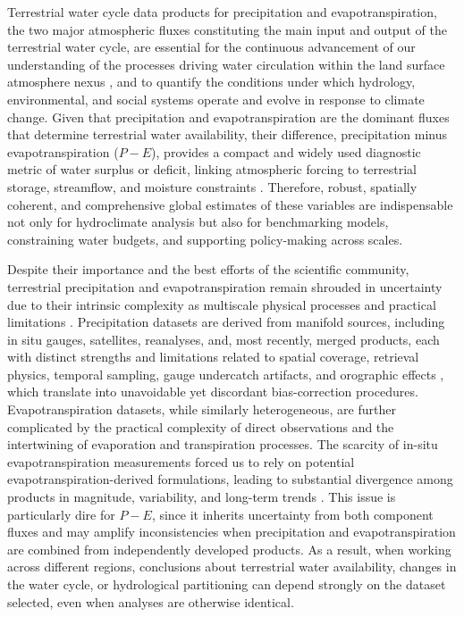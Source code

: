 \documentclass[essd, manuscript]{copernicus}
\begin{document}
\introduction  %
Terrestrial water cycle data products for precipitation and evapotranspiration, the two major atmospheric fluxes constituting the main input and output of the terrestrial water cycle, are essential for the continuous advancement of our understanding of the processes driving water circulation within the land surface atmosphere nexus \citep{vargas_godoy_global_2021}, and to quantify the conditions under which hydrology, environmental, and social systems operate and evolve in response to climate change. Given that precipitation and evapotranspiration are the dominant fluxes that determine terrestrial water availability, their difference, precipitation minus evapotranspiration ($P-E$), provides a compact and widely used diagnostic metric of water surplus or deficit, linking atmospheric forcing to terrestrial storage, streamflow, and moisture constraints \citep{allan_advances_2020}. Therefore, robust, spatially coherent, and comprehensive global estimates of these variables are indispensable not only for hydroclimate analysis but also for benchmarking models, constraining water budgets, and supporting policy-making across scales.

Despite their importance and the best efforts of the scientific community, terrestrial precipitation and evapotranspiration remain shrouded in uncertainty due to their intrinsic complexity as multiscale physical processes and practical limitations \citep{su_precipitation_2026}. Precipitation datasets are derived from manifold sources, including in situ gauges, satellites, reanalyses, and, most recently, merged products, each with distinct strengths and limitations related to spatial coverage, retrieval physics, temporal sampling, gauge undercatch artifacts, and orographic effects \citep{sun_review_2018}, which translate into unavoidable yet discordant bias-correction procedures. Evapotranspiration datasets, while similarly heterogeneous, are further complicated by the practical complexity of direct observations and the intertwining of evaporation and transpiration processes. The scarcity of in-situ evapotranspiration measurements forced us to rely on potential evapotranspiration-derived formulations, leading to substantial divergence among products in magnitude, variability, and long-term trends \citep{thakur_unveiling_2025}. This issue is particularly dire for $P−E$, since it inherits uncertainty from both component fluxes and may amplify inconsistencies when precipitation and evapotranspiration are combined from independently developed products. As a result, when working across different regions, conclusions about terrestrial water availability, changes in the water cycle, or hydrological partitioning can depend strongly on the dataset selected, even when analyses are otherwise identical.
\end{document}
